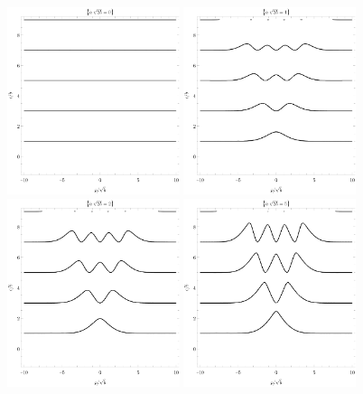 \begin{figure}[p]
    \centering
    \noindent
    \includegraphics[width=0.45\textwidth]{grafy/dirac0.pdf}%
    \hspace{0.1\textwidth}%
    \includegraphics[width=0.45\textwidth]{grafy/dirac1.pdf}%
    \\[1em]%
    \includegraphics[width=0.45\textwidth]{grafy/dirac2.pdf}%
    \hspace{0.1\textwidth}%
    \includegraphics[width=0.45\textwidth]{grafy/dirac5.pdf}%

\end{figure}
